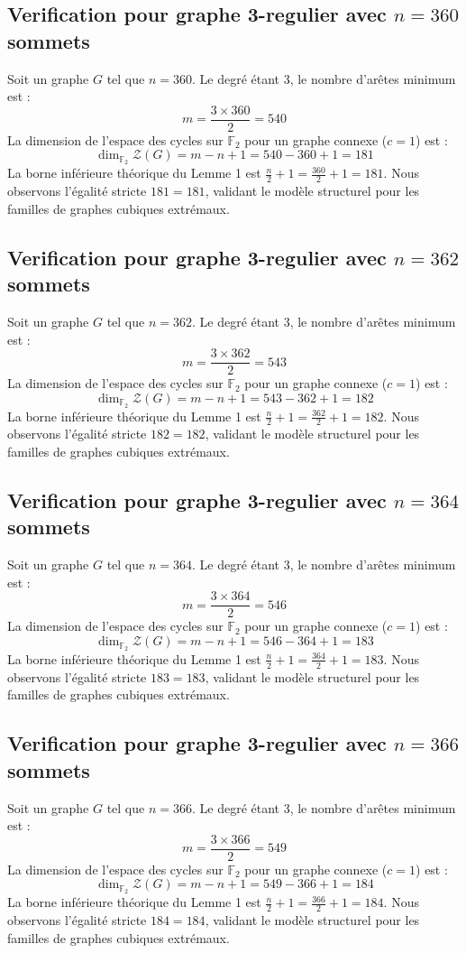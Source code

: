 \documentclass[11pt,a4paper]{article}
\begin{document}
\subsection{Verification pour graphe 3-regulier avec $n=360$ sommets}
Soit un graphe $G$ tel que $n = 360$. Le degré étant 3, le nombre d'arêtes minimum est :
$$ m = \frac{3 \times 360}{2} = 540 $$
La dimension de l'espace des cycles sur $\mathbb{F}_2$ pour un graphe connexe ($c=1$) est :
$$ \dim_{\mathbb{F}_2} \mathcal{Z}(G) = m - n + 1 = 540 - 360 + 1 = 181 $$
La borne inférieure théorique du Lemme 1 est $\frac{n}{2} + 1 = \frac{360}{2} + 1 = 181$.
Nous observons l'égalité stricte $181 = 181$, validant le modèle structurel pour les familles de graphes cubiques extrémaux.

\subsection{Verification pour graphe 3-regulier avec $n=362$ sommets}
Soit un graphe $G$ tel que $n = 362$. Le degré étant 3, le nombre d'arêtes minimum est :
$$ m = \frac{3 \times 362}{2} = 543 $$
La dimension de l'espace des cycles sur $\mathbb{F}_2$ pour un graphe connexe ($c=1$) est :
$$ \dim_{\mathbb{F}_2} \mathcal{Z}(G) = m - n + 1 = 543 - 362 + 1 = 182 $$
La borne inférieure théorique du Lemme 1 est $\frac{n}{2} + 1 = \frac{362}{2} + 1 = 182$.
Nous observons l'égalité stricte $182 = 182$, validant le modèle structurel pour les familles de graphes cubiques extrémaux.

\subsection{Verification pour graphe 3-regulier avec $n=364$ sommets}
Soit un graphe $G$ tel que $n = 364$. Le degré étant 3, le nombre d'arêtes minimum est :
$$ m = \frac{3 \times 364}{2} = 546 $$
La dimension de l'espace des cycles sur $\mathbb{F}_2$ pour un graphe connexe ($c=1$) est :
$$ \dim_{\mathbb{F}_2} \mathcal{Z}(G) = m - n + 1 = 546 - 364 + 1 = 183 $$
La borne inférieure théorique du Lemme 1 est $\frac{n}{2} + 1 = \frac{364}{2} + 1 = 183$.
Nous observons l'égalité stricte $183 = 183$, validant le modèle structurel pour les familles de graphes cubiques extrémaux.

\subsection{Verification pour graphe 3-regulier avec $n=366$ sommets}
Soit un graphe $G$ tel que $n = 366$. Le degré étant 3, le nombre d'arêtes minimum est :
$$ m = \frac{3 \times 366}{2} = 549 $$
La dimension de l'espace des cycles sur $\mathbb{F}_2$ pour un graphe connexe ($c=1$) est :
$$ \dim_{\mathbb{F}_2} \mathcal{Z}(G) = m - n + 1 = 549 - 366 + 1 = 184 $$
La borne inférieure théorique du Lemme 1 est $\frac{n}{2} + 1 = \frac{366}{2} + 1 = 184$.
Nous observons l'égalité stricte $184 = 184$, validant le modèle structurel pour les familles de graphes cubiques extrémaux.
\end{document}
